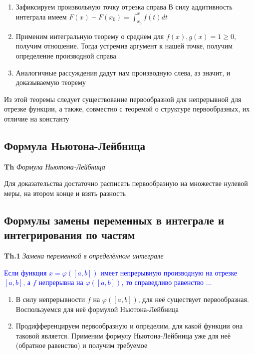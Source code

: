 \documentclass[a4paper, 14pt]{article}
\begin{document}
    \begin{enumerate}
        \item Зафиксируем произвольную точку отрезка справа
        В силу аддитивность интеграла имеем $F(x) - F(x_0) = \int_{x_0}^x f(t)dt$
        \item Применим интегральную теорему о среднем для $f(x), g(x) = 1 \geq 0$, получим отношение.
        Тогда устремив аргумент к нашей точке, получим определение производной справа
        \item Аналогичные рассуждения дадут нам производную слева, аз значит, и доказываемую теорему
    \end{enumerate}

    Из этой теоремы следует существование первообразной для непрерывной для отрезке функции, а также, совместно с
    теоремой о структуре первообразных, их отличие на константу

    \subsection{Формула Ньютона-Лейбница}

    \textbf{Th} \textit{Формула Ньютона-Лейбница}

    Для доказательства достаточно расписать первообразную на множестве нулевой меры, на втором конце и взять разность

    \subsection{Формулы замены переменных в интеграле и интегрирования по частям}

    \textbf{Th.1} \textit{Замена переменной в определённом интеграле}

    \textcolor{blue}{Если функция $x = \varphi([a, b])$ имеет непрерывную производную на отрезке $[a, b]$, а $f$
        непрерывна на $\varphi([a, b])$, то справедливо равенство ...}

    \begin{enumerate}
        \item В силу непрерывности $f$ на $\varphi([a, b])$, для неё существует первообразная.
        Воспользуемся для неё формулой Ньютона-Лейбница
        \item Продифференцируем первообразную и определим, для какой функции она таковой является.
        Применим формулу Ньютона-Лейбница уже для неё (обратное равенство) и получим требуемое
    \end{enumerate}
\end{document}
